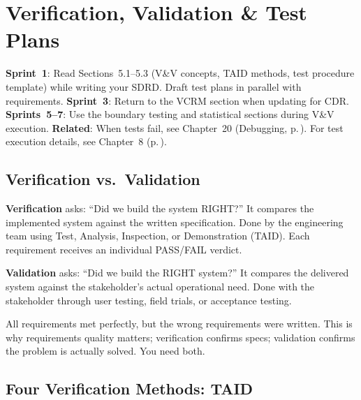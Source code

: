 \chapter{Verification, Validation \& Test Plans}\label{ch:vv}

\vspace{1em}

\begin{tipbox}
\textbf{Sprint~1}: Read Sections~5.1--5.3 (V\&V concepts, TAID methods, test procedure template) while writing your SDRD. Draft test plans in parallel with requirements. \textbf{Sprint~3}: Return to the VCRM section when updating for CDR. \textbf{Sprints~5--7}: Use the boundary testing and statistical sections during V\&V execution. \textbf{Related}: When tests fail, see Chapter~20 (Debugging, p.\,\pageref{ch:debug}). For test execution details, see Chapter~8 (p.\,\pageref{ch:postbuild}).
\end{tipbox}

\vspace{1em}

\section{Verification vs.\ Validation}


\textbf{Verification} asks: ``Did we build the system RIGHT?'' It compares the implemented system against the written specification. Done by the engineering team using Test, Analysis, Inspection, or Demonstration (TAID). Each requirement receives an individual PASS/FAIL verdict.

\textbf{Validation} asks: ``Did we build the RIGHT system?'' It compares the delivered system against the stakeholder's actual operational need. Done with the stakeholder through user testing, field trials, or acceptance testing.

\begin{warningbox}
All requirements met perfectly, but the wrong requirements were written. This is why requirements quality matters; verification confirms specs; validation confirms the problem is actually solved. You need both.
\end{warningbox}

\section{Four Verification Methods: TAID}


